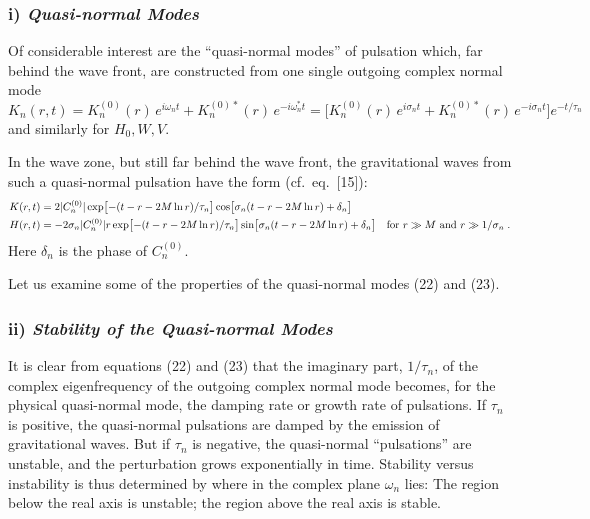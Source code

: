 \documentclass[12pt]{article}
\begin{document}
\subsubsection*{i) \textit{Quasi-normal Modes}}

Of considerable interest are the ``quasi-normal modes'' of pulsation which, far behind
the wave front, are constructed from one single outgoing complex normal mode
\begin{equation}
  K_n(r,t) = K_n^{(0)}(r)\, e^{i\omega_n t} + K_n^{(0)*}(r)\, e^{-i\omega_n^* t}
  = \bigl[ K_n^{(0)}(r)\, e^{i\sigma_n t} + K_n^{(0)*}(r)\, e^{-i\sigma_n t} \bigr] e^{-t/\tau_n}
\label{eq:22}
\end{equation}
and similarly for $H_0, W, V$.

In the wave zone, but still far behind the wave front, the gravitational waves from such
a quasi-normal pulsation have the form (cf.\ eq.\ [15]):
\begin{align}
  K(r,t) &= 2 |C_n^{(0)}| \exp\bigl[-(t - r - 2M\ln r)/\tau_n\bigr]
             \cos\bigl[\sigma_n(t - r - 2M\ln r) + \delta_n\bigr] \notag \\
  H(r,t) &= -2\sigma_n |C_n^{(0)}| r \exp\bigl[-(t - r - 2M\ln r)/\tau_n\bigr]
             \sin\bigl[\sigma_n(t - r - 2M\ln r) + \delta_n\bigr]
             \quad \text{for } r \gg M \text{ and } r \gg 1/\sigma_n \;.
\label{eq:23}
\end{align}
Here $\delta_n$ is the phase of $C_n^{(0)}$.

Let us examine some of the properties of the quasi-normal modes (22) and (23).

\subsubsection*{ii) \textit{Stability of the Quasi-normal Modes}}

It is clear from equations (22) and (23) that the imaginary part, $1/\tau_n$, of the complex
eigenfrequency of the outgoing complex normal mode becomes, for the physical
quasi-normal mode, the damping rate or growth rate of pulsations. If $\tau_n$ is positive, the
quasi-normal pulsations are damped by the emission of gravitational waves. But if $\tau_n$
is negative, the quasi-normal ``pulsations'' are unstable, and the perturbation grows
exponentially in time. Stability versus instability is thus determined by where in the
complex plane $\omega_n$ lies: The region below the real axis is unstable; the region above the
real axis is stable.
\end{document}

